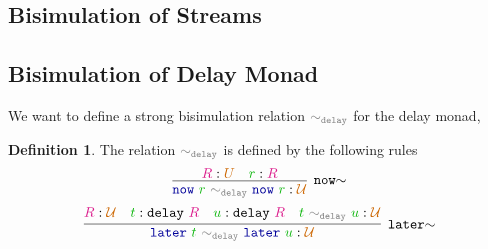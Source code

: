 \documentclass[twoside,11pt,openright]{report}
\theoremstyle{plain} %
\theoremstyle{definition}
\newtheorem{defn}{Definition}[section]
\theoremstyle{remark}
\newcommand*{\term}[1]{\textcolor{green!70!black}{#1}} %
\newcommand*{\type}[1]{\textcolor{magenta!90!black}{#1}}
\newcommand*{\universe}[1]{\textcolor{orange!80!black}{#1}}
\newcommand*{\relation}[1]{\textcolor{gray}{\ensuremath{\mathtt{#1}}}}
\newcommand*{\function}[1]{\textcolor{blue!60!black}{\ensuremath{\mathtt{#1}}}}
\newcommand*{\typeformer}[1]{\ensuremath{\mathtt{#1}}}
\begin{document}
\subsection{Bisimulation of Streams}
\subsection{Bisimulation of Delay Monad}
We want to define a strong bisimulation relation \(\relation{\sim_{delay}}\) for the delay monad, 
\begin{defn}
  The relation \(\relation{\sim_{delay}}\) is defined by the following rules
  \begin{equation}
    \infer[\mathtt{now}\hspace{-1mm}\sim]{\function{now}~\term{r}~\relation{\sim_{delay}}~\function{now}~\term{r} : \universe{\mathcal{U}}}{\type{R} : \universe{U} & \term{r} : \type{R}}
  \end{equation}
  \begin{equation}
    \infer[\mathtt{later}\hspace{-1mm}\sim]{\function{later}~\term{t}~\relation{\sim_{delay}}~\function{later}~\term{u} : \universe{\mathcal{U}}}{\type{R} : \universe{\mathcal{U}} & \term{t} : \typeformer{delay}~\type{R} & \term{u} : \typeformer{delay}~\type{R} & \term{t}~\relation{\sim_{delay}}~\term{u} : \universe{\mathcal{U}}}
  \end{equation}
\end{defn}
\end{document}
